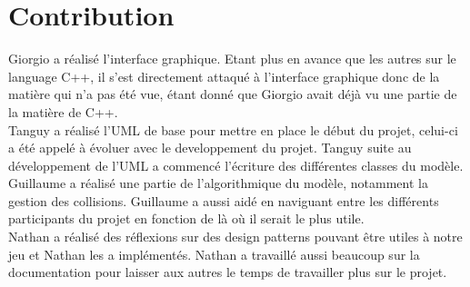\section{Contribution}

Giorgio a réalisé l'interface graphique. Etant plus en avance que les autres sur le language C++, il s'est directement attaqué à l'interface graphique donc de la matière qui n'a pas été vue, étant donné que Giorgio avait déjà vu une partie de la matière de C++.
\\

Tanguy a réalisé  l'UML de base pour mettre en place le début du projet, celui-ci a été appelé à évoluer avec le developpement du projet. Tanguy suite au développement de l'UML a commencé l'écriture des différentes classes du modèle.\\

Guillaume a réalisé une partie de l'algorithmique du modèle, notamment la gestion des collisions. Guillaume a aussi aidé en naviguant entre les différents participants du projet en fonction de là où il serait le plus utile.\\

Nathan a réalisé des réflexions sur des design patterns pouvant être utiles à notre jeu et Nathan les a implémentés. Nathan a travaillé aussi beaucoup sur la documentation pour laisser aux autres le temps de travailler plus sur le projet.\\
